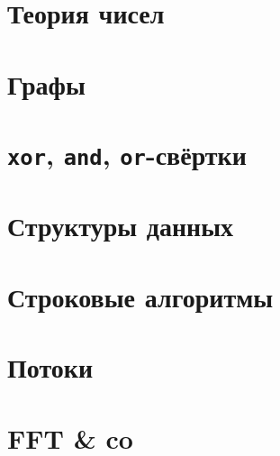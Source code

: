 \documentclass[a4paper,twocolumn,8pt]{extarticle}
\begin{document}
    \pagestyle{fancy}
    \tableofcontents
    \newpage
    \section{Теория чисел}
    
    

    \section{Графы}
    
    
    

    \section{\texttt{xor}, \texttt{and}, \texttt{or}-свёртки}
    

    \section{Структуры данных}
    
    
    

    \section{Строковые алгоритмы}
    
    
    
    
    

    \section{Потоки}
    
    

    \section{FFT \& co}
    
\end{document}
